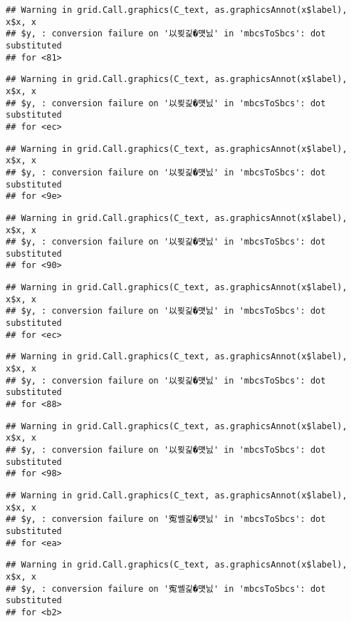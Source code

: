 \documentclass[]{article}
\begin{document}
\begin{verbatim}
## Warning in grid.Call.graphics(C_text, as.graphicsAnnot(x$label), x$x, x
## $y, : conversion failure on '以묒긽�먯닔' in 'mbcsToSbcs': dot substituted
## for <81>
\end{verbatim}

\begin{verbatim}
## Warning in grid.Call.graphics(C_text, as.graphicsAnnot(x$label), x$x, x
## $y, : conversion failure on '以묒긽�먯닔' in 'mbcsToSbcs': dot substituted
## for <ec>
\end{verbatim}

\begin{verbatim}
## Warning in grid.Call.graphics(C_text, as.graphicsAnnot(x$label), x$x, x
## $y, : conversion failure on '以묒긽�먯닔' in 'mbcsToSbcs': dot substituted
## for <9e>
\end{verbatim}

\begin{verbatim}
## Warning in grid.Call.graphics(C_text, as.graphicsAnnot(x$label), x$x, x
## $y, : conversion failure on '以묒긽�먯닔' in 'mbcsToSbcs': dot substituted
## for <90>
\end{verbatim}

\begin{verbatim}
## Warning in grid.Call.graphics(C_text, as.graphicsAnnot(x$label), x$x, x
## $y, : conversion failure on '以묒긽�먯닔' in 'mbcsToSbcs': dot substituted
## for <ec>
\end{verbatim}

\begin{verbatim}
## Warning in grid.Call.graphics(C_text, as.graphicsAnnot(x$label), x$x, x
## $y, : conversion failure on '以묒긽�먯닔' in 'mbcsToSbcs': dot substituted
## for <88>
\end{verbatim}

\begin{verbatim}
## Warning in grid.Call.graphics(C_text, as.graphicsAnnot(x$label), x$x, x
## $y, : conversion failure on '以묒긽�먯닔' in 'mbcsToSbcs': dot substituted
## for <98>
\end{verbatim}

\begin{verbatim}
## Warning in grid.Call.graphics(C_text, as.graphicsAnnot(x$label), x$x, x
## $y, : conversion failure on '寃쎌긽�먯닔' in 'mbcsToSbcs': dot substituted
## for <ea>
\end{verbatim}

\begin{verbatim}
## Warning in grid.Call.graphics(C_text, as.graphicsAnnot(x$label), x$x, x
## $y, : conversion failure on '寃쎌긽�먯닔' in 'mbcsToSbcs': dot substituted
## for <b2>
\end{verbatim}
\end{document}
